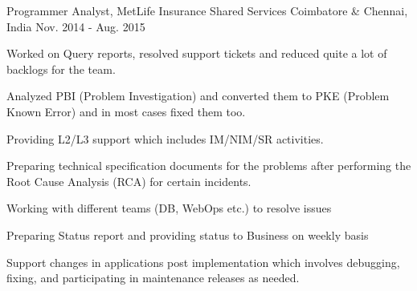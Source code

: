 \begin{cventries}
  \cventry
    {Programmer Analyst, MetLife Insurance} %
    {Shared Services} %
    {Coimbatore \& Chennai, India} %
    {Nov. 2014 - Aug. 2015} %
    {
      \begin{cvitems}
        \item{Worked on Query reports, resolved support tickets and reduced quite a lot of backlogs for the team.}
        \item{Analyzed PBI (Problem Investigation) and converted them to PKE (Problem Known Error) and in most cases fixed them too.}
        \item{Providing L2/L3 support which includes IM/NIM/SR activities.}
        \item{Preparing technical specification documents for the problems after performing the Root Cause Analysis (RCA) for certain incidents.}
        \item{Working with different teams (DB, WebOps etc.) to resolve issues}
        \item{Preparing Status report and providing status to Business on weekly basis}
        \item{Support changes in applications post implementation which involves debugging, fixing, and participating in maintenance releases as needed.}
      \end{cvitems}
    }

\end{cventries}
